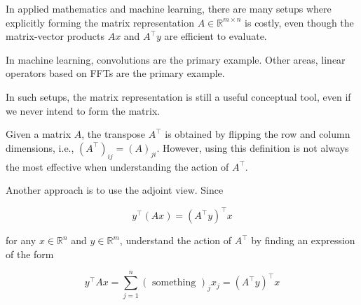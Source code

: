 \documentclass{report}
\begin{document}
\begin{concept}
    In applied mathematics and machine learning, there are many setups where explicitly forming the matrix representation $A \in \mathbb{R}^{m \times n}$ is costly, even though the matrix-vector products $A x$ and $A^{\top} y$ are efficient to evaluate.

    In machine learning, convolutions are the primary example. Other areas, linear operators based on FFTs are the primary example.

    In such setups, the matrix representation is still a useful conceptual tool, even if we never intend to form the matrix.
\end{concept}

Given a matrix $A$, the transpose $A^{\top}$ is obtained by flipping the row and column dimensions, i.e., $\left(A^{\top}\right)_{i j}=(A)_{j i}$.
However, using this definition is not always the most effective when understanding the action of $A^{\top}$.

Another approach is to use the adjoint view. Since

$$
y^{\top}(A x)=\left(A^{\top} y\right)^{\top} x
$$

for any $x \in \mathbb{R}^{n}$ and $y \in \mathbb{R}^{m}$, understand the action of $A^{\top}$ by finding an expression of the form

$$
y^{\top} A x=\sum_{j=1}^{n}(\text { something })_{j} x_{j}=\left(A^{\top} y\right)^{\top} x
$$
\end{document}
